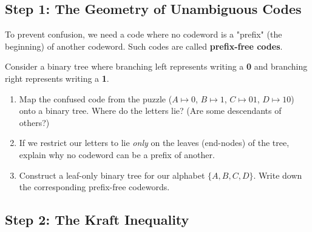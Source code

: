 \subsection{Step 1: The Geometry of Unambiguous Codes}

To prevent confusion, we need a code where no codeword is a "prefix" (the beginning) of another codeword. Such codes are called \textbf{prefix-free codes}.

\begin{problem}
Consider a binary tree where branching left represents writing a \textbf{0} and branching right represents writing a \textbf{1}.
\begin{enumerate}[label=(\alph*), topsep=2pt]
  \item Map the confused code from the puzzle ($A \mapsto 0$, $B \mapsto 1$, $C \mapsto 01$, $D \mapsto 10$) onto a binary tree. Where do the letters lie? (Are some descendants of others?)
  \item If we restrict our letters to lie \emph{only} on the leaves (end-nodes) of the tree, explain why no codeword can be a prefix of another.
  \item Construct a leaf-only binary tree for our alphabet $\{A, B, C, D\}$. Write down the corresponding prefix-free codewords.
\end{enumerate}
\end{problem}

\begin{center}
\end{center}

\subsection{Step 2: The Kraft Inequality}

